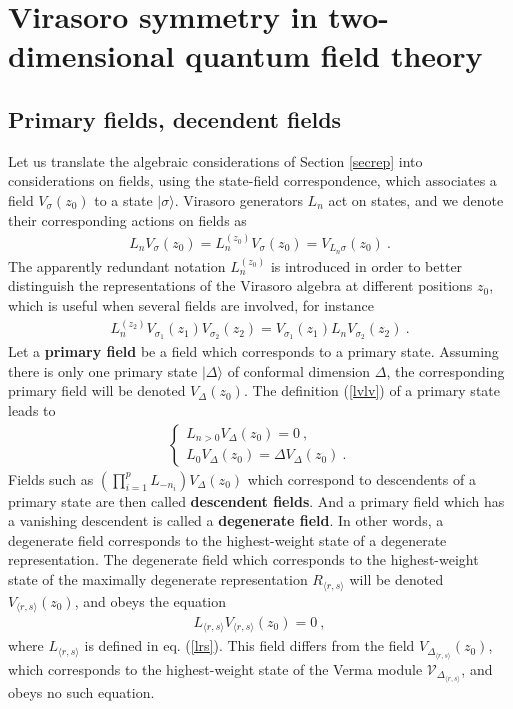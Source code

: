 \documentclass[12pt,a4paper,notitlepage]{report}
\newcommand \bla {\left\{\begin{array}{l} }
\newcommand \ela {\end{array}\right. }
\numberwithin{equation}{section}
\theoremstyle{break}
\begin{document}
\section{Virasoro symmetry in two-dimensional quantum field theory\label{seclin}}

\subsection{Primary fields, decendent fields}

Let us translate the algebraic considerations of Section \ref{secrep} into considerations on fields, using the state-field correspondence,
which associates a field $V_\sigma(z_0)$ to a state $|\sigma\rangle$. Virasoro generators $L_n$ act on states, and we denote their corresponding actions on fields as 
\begin{align}
 L_nV_\sigma(z_0) = L_n^{(z_0)}V_\sigma(z_0) = V_{L_n\sigma}(z_0)\ .
\label{lnzv}
\end{align}
The apparently redundant notation $L_n^{(z_0)}$ is introduced in order to better distinguish the representations of the Virasoro algebra at different positions $z_0$, which is useful when several fields are involved, for instance 
\begin{align}
 L_n^{(z_2)} V_{\sigma_1}(z_1)V_{\sigma_2}(z_2) = V_{\sigma_1}(z_1) L_nV_{\sigma_2}(z_2)\ .
\end{align}
Let a \textbf{\boldmath primary field} be a field which corresponds to a primary state. Assuming there is only one primary state $|\Delta\rangle$ of conformal dimension $\Delta$, the corresponding primary field will be denoted
$V_\Delta(z_0)$. The definition (\ref{lvlv}) of a primary state leads to 
\begin{align}
\boxed{
 \bla L_{n>0} V_\Delta(z_0) = 0 \ , 
\\
L_0 V_\Delta(z_0) = \Delta V_\Delta(z_0) \ .
\ela
}
\label{ldld}
\end{align}
Fields such as  $\left(\prod_{i=1}^p L_{-n_i}\right) V_\Delta(z_0)$ which correspond to descendents of a primary state are then called  \textbf{descendent fields}. And a primary field which has a vanishing descendent is called a \textbf{\boldmath degenerate field}. In other words, a degenerate field corresponds to the highest-weight state of a degenerate representation. The degenerate field which corresponds to the highest-weight state of the maximally degenerate representation $R_{\langle r,s \rangle}$ will be denoted $V_{\langle r,s\rangle}(z_0)$, and obeys the equation 
\begin{align}
 L_{\langle r,s \rangle} V_{\langle r,s \rangle}(z_0) = 0 \ , 
\label{lrsv}
\end{align}
where $L_{\langle r,s \rangle}$ is defined in eq. (\ref{lrs}).
This field differs from the field $V_{\Delta_{\langle r,s \rangle}}(z_0)$, which corresponds to the highest-weight state of the Verma module $\mathcal{V}_{\Delta_{\langle r,s \rangle}}$, and obeys no such equation.
\end{document}
